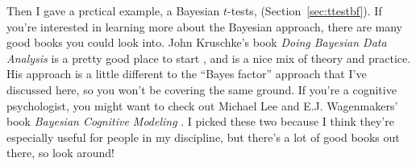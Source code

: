 Then I gave a prctical example, a Bayesian $t$-tests, (Section~\ref{sec:ttestbf}). If you're interested in learning more about the Bayesian approach, there are many good books you could look into. John Kruschke's book {\it Doing Bayesian Data Analysis} is a pretty good place to start \cite{Kruschke2011}, and is a nice mix of theory and practice. His approach is a little different to the ``Bayes factor'' approach that I've discussed here, so you won't be covering the same ground. If you're a cognitive psychologist, you might want to check out Michael Lee and E.J. Wagenmakers' book {\it Bayesian Cognitive Modeling} \cite{Lee2014}. I picked these two because I think they're especially useful for people in my discipline, but there's a lot of good books out there, so look around!




